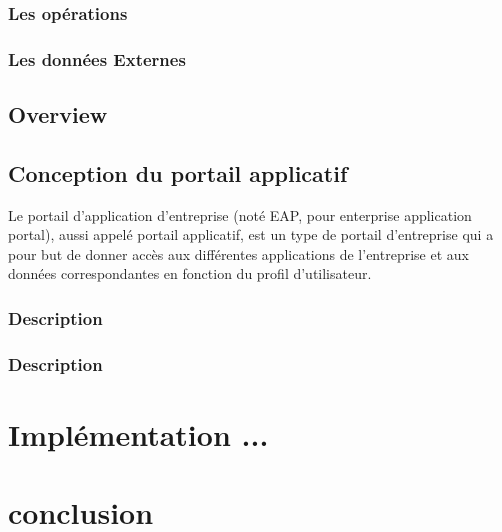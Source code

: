 \documentclass[a4paper,12pt]{article}
\begin{document}
\subsubsection{Les opérations}
\subsubsection{Les données Externes}%

\subsection{Overview}

\subsection{Conception du portail applicatif}%
Le portail d'application d'entreprise (noté EAP, pour enterprise application
portal), aussi appelé portail applicatif, est un type de portail
d'entreprise qui a pour but de donner accès
aux différentes applications de l'entreprise et aux données
correspondantes en fonction du profil d'utilisateur. 
   
   
\subsubsection{Description}
\subsubsection{Description}

\section{Implémentation ...}
\section{conclusion}
\end{document}
